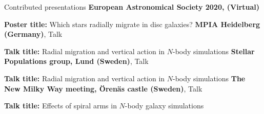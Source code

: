 \begin{rubric}{Contributed presentations}
%
\textbf{European Astronomical Society 2020, (Virtual)}\par
\textbf{Poster title:} Which stars radially migrate in disc galaxies?
%
\entry*[6 May 2020]%
\textbf{MPIA Heidelberg (Germany)}, Talk \par
\textbf{Talk title:} Radial migration and vertical action in $N$-body simulations
%
\entry*[5 May 2020]%
\textbf{Stellar Populations group, Lund (Sweden)}, Talk \par
\textbf{Talk title:} Radial migration and vertical action in $N$-body simulations
%
\entry*[27 May 2019]%
\textbf{The New Milky Way meeting, Örenäs castle (Sweden)}, Talk \par
\textbf{Talk title:} Effects of spiral arms in $N$-body galaxy simulations
%
%
\end{rubric}